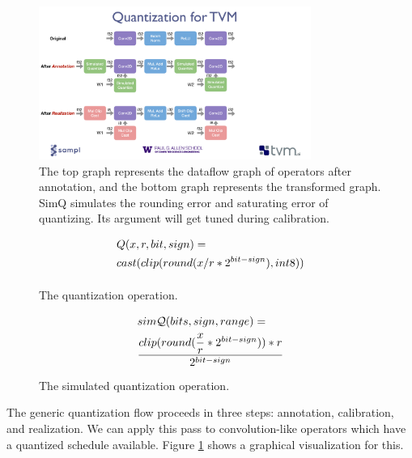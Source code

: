 \begin{figure}[h]
  \includegraphics[height=5cm]{fig_splash19/quantization/quant_pdf.pdf}
  \caption{The top graph represents the dataflow graph of operators after annotation,
  and the bottom graph represents the transformed graph.
  SimQ simulates the rounding error and saturating error of quantizing.
  Its argument will get tuned during calibration.}
  \label{fig:quant_flow}
\end{figure}

\begin{figure}[h]
    \begin{equation}
      \begin{aligned}[b]
        \scriptscriptstyle
        & Q(x, r, bit, sign) =\\ & cast(clip(round(x/r*2^{bit-sign}), int8)) \\
      \end{aligned}
    \end{equation}
    \caption{The quantization operation.}
    \label{fig:quant_op}
    \begin{equation}
      \begin{aligned}[b]
        \scriptscriptstyle
        & sim\mathcal{Q}(bits, sign, range) =\\ & \dfrac{clip(round(\dfrac{x}{r} * 2^{bit - sign})) * r}{2^{bit - sign}}
      \end{aligned}
    \end{equation}
    \caption{The simulated quantization operation.}
    \label{fig:sim_quant_op}
\end{figure}

The generic quantization flow proceeds in three steps: annotation, calibration, and realization. We
can apply this pass to convolution-like operators which have a quantized schedule
available. Figure \ref{fig:quant_flow} shows a graphical visualization for this.



